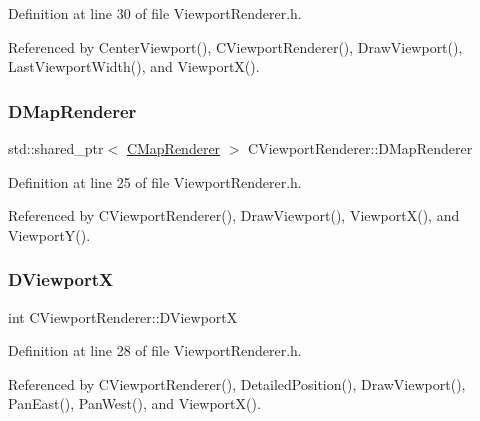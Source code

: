 Definition at line 30 of file Viewport\+Renderer.\+h.



Referenced by Center\+Viewport(), C\+Viewport\+Renderer(), Draw\+Viewport(), Last\+Viewport\+Width(), and Viewport\+X().

\hypertarget{classCViewportRenderer_ac6bc7771bd6dcd35107d25bebb0c0a4c}{}\label{classCViewportRenderer_ac6bc7771bd6dcd35107d25bebb0c0a4c} 
\subsubsection{\texorpdfstring{D\+Map\+Renderer}{DMapRenderer}}
{\footnotesize\ttfamily std\+::shared\+\_\+ptr$<$ \hyperlink{classCMapRenderer}{C\+Map\+Renderer} $>$ C\+Viewport\+Renderer\+::\+D\+Map\+Renderer\hspace{0.3cm}{\ttfamily [protected]}}



Definition at line 25 of file Viewport\+Renderer.\+h.



Referenced by C\+Viewport\+Renderer(), Draw\+Viewport(), Viewport\+X(), and Viewport\+Y().

\hypertarget{classCViewportRenderer_aea9e05347f71a8e6b83439aab653be18}{}\label{classCViewportRenderer_aea9e05347f71a8e6b83439aab653be18} 
\subsubsection{\texorpdfstring{D\+ViewportX}{DViewportX}}
{\footnotesize\ttfamily int C\+Viewport\+Renderer\+::\+D\+ViewportX\hspace{0.3cm}{\ttfamily [protected]}}



Definition at line 28 of file Viewport\+Renderer.\+h.



Referenced by C\+Viewport\+Renderer(), Detailed\+Position(), Draw\+Viewport(), Pan\+East(), Pan\+West(), and Viewport\+X().

\hypertarget{classCViewportRenderer_ae13dd437a3da3d2bab16bc7ba61cb78f}{}\label{classCViewportRenderer_ae13dd437a3da3d2bab16bc7ba61cb78f} 
